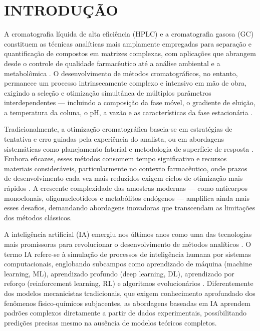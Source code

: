 \documentclass[preprint,12pt]{elsarticle}
\begin{document}
\section{INTRODUÇÃO}

A cromatografia líquida de alta eficiência (HPLC) e a cromatografia gasosa (GC) constituem as técnicas analíticas mais amplamente empregadas para separação e quantificação de compostos em matrizes complexas, com aplicações que abrangem desde o controle de qualidade farmacêutico até a análise ambiental e a metabolômica \cite{kalpana2024, sherwani2025}. O desenvolvimento de métodos cromatográficos, no entanto, permanece um processo intrinsecamente complexo e intensivo em mão de obra, exigindo a seleção e otimização simultânea de múltiplos parâmetros interdependentes — incluindo a composição da fase móvel, o gradiente de eluição, a temperatura da coluna, o pH, a vazão e as características da fase estacionária \cite{antony2025}.

Tradicionalmente, a otimização cromatográfica baseia-se em estratégias de tentativa e erro guiadas pela experiência do analista, ou em abordagens sistemáticas como planejamento fatorial e metodologia de superfície de resposta \cite{sulthana2026}. Embora eficazes, esses métodos consomem tempo significativo e recursos materiais consideráveis, particularmente no contexto farmacêutico, onde prazos de desenvolvimento cada vez mais reduzidos exigem ciclos de otimização mais rápidos \cite{mouellef2021}. A crescente complexidade das amostras modernas — como anticorpos monoclonais, oligonucleotídeos e metabólitos endógenos — amplifica ainda mais esses desafios, demandando abordagens inovadoras que transcendam as limitações dos métodos clássicos.

A inteligência artificial (IA) emergiu nos últimos anos como uma das tecnologias mais promissoras para revolucionar o desenvolvimento de métodos analíticos \cite{kalpana2024}. O termo IA refere-se à simulação de processos de inteligência humana por sistemas computacionais, englobando subcampos como aprendizado de máquina (machine learning, ML), aprendizado profundo (deep learning, DL), aprendizado por reforço (reinforcement learning, RL) e algoritmos evolucionários \cite{sherwani2025, ghali2020}. Diferentemente dos modelos mecanicistas tradicionais, que exigem conhecimento aprofundado dos fenômenos físico-químicos subjacentes, as abordagens baseadas em IA aprendem padrões complexos diretamente a partir de dados experimentais, possibilitando predições precisas mesmo na ausência de modelos teóricos completos.
\end{document}
